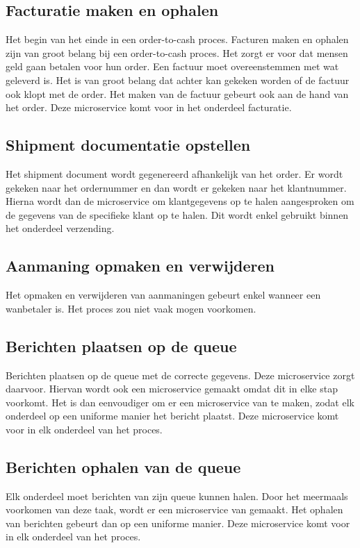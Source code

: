 \subsection{Facturatie maken en ophalen}
Het begin van het einde in een order-to-cash proces. Facturen maken en ophalen zijn van groot belang bij een order-to-cash proces. Het zorgt er voor dat mensen geld gaan betalen voor hun order. Een factuur moet overeenstemmen met wat geleverd is. Het is van groot belang dat achter kan gekeken worden of de factuur ook klopt met de order. Het maken van de factuur gebeurt ook aan de hand van het order. 
Deze microservice komt voor in het onderdeel facturatie.

\subsection{Shipment documentatie opstellen}
Het shipment document wordt gegenereerd afhankelijk van het order. Er wordt gekeken naar het ordernummer en dan wordt er gekeken naar het klantnummer. Hierna wordt dan de microservice om klantgegevens op te halen aangesproken om de gegevens van de specifieke klant op te halen. Dit wordt enkel gebruikt binnen het onderdeel verzending.

\subsection{Aanmaning opmaken en verwijderen}
Het opmaken en verwijderen van aanmaningen gebeurt enkel wanneer een wanbetaler is. Het proces zou niet vaak mogen voorkomen. 

\subsection{Berichten plaatsen op de queue}
Berichten plaatsen op de queue met de correcte gegevens. Deze microservice zorgt daarvoor. Hiervan wordt ook een microservice gemaakt omdat dit in elke stap voorkomt. Het is dan eenvoudiger om er een microservice van te maken, zodat elk onderdeel op een uniforme manier het bericht plaatst. 
Deze microservice komt voor in elk onderdeel van het proces.

\subsection{Berichten ophalen van de queue} 
Elk onderdeel moet berichten van zijn queue kunnen halen. Door het meermaals voorkomen van deze taak, wordt er een microservice van gemaakt. Het ophalen van berichten gebeurt dan op een uniforme manier. 
Deze microservice komt voor in elk onderdeel van het proces.


